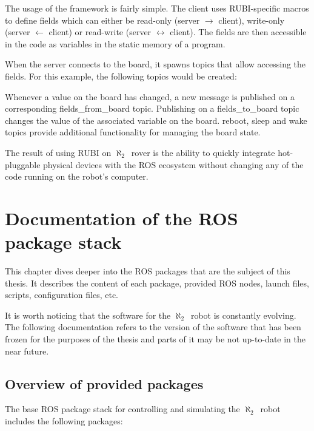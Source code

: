 \documentclass[english,inz,shortabstract]{iithesis}
\newcommand{\rovername}{$\aleph_2$\ }
\begin{document}
	The usage of the framework is fairly simple. The client uses RUBI-specific macros to define fields which can either be read-only (server $\rightarrow$ client), write-only (server $\leftarrow$ client) or read-write (server $\leftrightarrow$ client). The fields are then accessible in the code as variables in the static memory of a program.

	

	When the server connects to the board, it spawns topics that allow accessing the fields. For this example, the following topics would be created:

	

	Whenever a value on the board has changed, a new message is published on a corresponding \textsf{fields\_from\_board} topic. Publishing on a \textsf{fields\_to\_board} topic changes the value of the associated variable on the board. \textsf{reboot}, \textsf{sleep} and \textsf{wake} topics provide additional functionality for managing the board state.

	The result of using RUBI on \rovername rover is the ability to quickly integrate hot-pluggable physical devices with the ROS ecosystem without changing any of the code running on the robot's computer.


\chapter{Documentation of the ROS package stack}

This chapter dives deeper into the ROS packages that are the subject of this thesis. It describes the content of each package, provided ROS nodes, launch files, scripts, configuration files, etc.

It is worth noticing that the software for the \rovername robot is constantly evolving. The following documentation refers to the version of the software that has been frozen for the purposes of the thesis and parts of it may be not up-to-date in the near future.

\section{Overview of provided packages}

	The base ROS package stack for controlling and simulating the \rovername robot includes the following packages:
\end{document}
